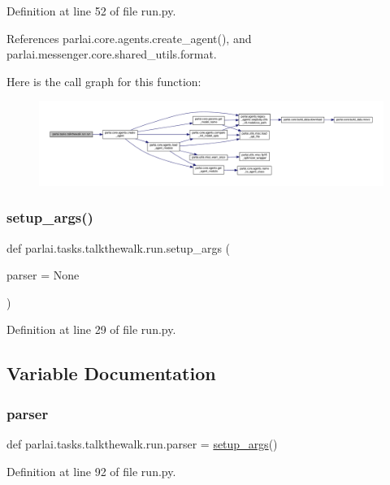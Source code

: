 Definition at line 52 of file run.\+py.



References parlai.\+core.\+agents.\+create\+\_\+agent(), and parlai.\+messenger.\+core.\+shared\+\_\+utils.\+format.

Here is the call graph for this function\+:
\nopagebreak
\begin{figure}[H]
\begin{center}
\leavevmode
\includegraphics[width=350pt]{namespaceparlai_1_1tasks_1_1talkthewalk_1_1run_a0a1ec08b8196cb008e4df83468c67e5b_cgraph}
\end{center}
\end{figure}
\mbox{\label{namespaceparlai_1_1tasks_1_1talkthewalk_1_1run_a3534e8afa0a4dc25a6e02740fa35ac84}} 
\subsubsection{\texorpdfstring{setup\+\_\+args()}{setup\_args()}}
{\footnotesize\ttfamily def parlai.\+tasks.\+talkthewalk.\+run.\+setup\+\_\+args (\begin{DoxyParamCaption}\item[{}]{parser = {\ttfamily None} }\end{DoxyParamCaption})}



Definition at line 29 of file run.\+py.



\subsection{Variable Documentation}
\mbox{\label{namespaceparlai_1_1tasks_1_1talkthewalk_1_1run_ae9970664deea071fd837c1d8052c9025}} 
\subsubsection{\texorpdfstring{parser}{parser}}
{\footnotesize\ttfamily def parlai.\+tasks.\+talkthewalk.\+run.\+parser = \hyperlink{namespaceparlai_1_1tasks_1_1talkthewalk_1_1run_a3534e8afa0a4dc25a6e02740fa35ac84}{setup\+\_\+args}()}



Definition at line 92 of file run.\+py.

